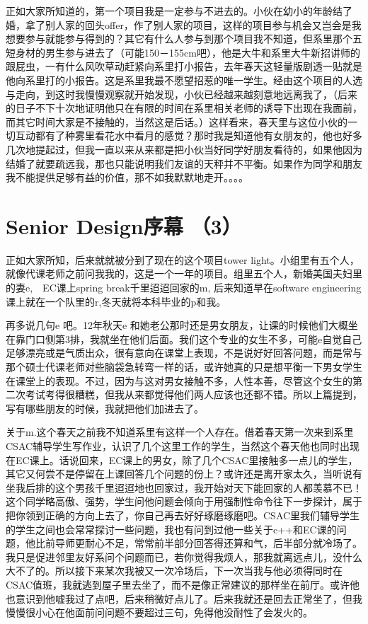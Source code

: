 \documentclass[12pt]{book}
\begin{document}
正如大家所知道的，第一个项目我是一定参与不进去的。小伙在幼小的年龄结了婚，拿了别人家的回头offer，作了别人家的项目，这样的项目参与机会又岂会是我想要参与就能参与得到的？其它有什么人参与到那个项目我不知道，但系里那个五短身材的男生参与进去了（可能150－155cm吧），他是大牛和系里大牛新招讲师的跟屁虫，一有什么风吹草动赶紧向系里打小报告，去年春天这轻量版剧透一贴就是他向系里打的小报告。这是系里我最不愿望招惹的唯一学生。经由这个项目的人选与走向，到这时我慢慢观察就开始发现，小伙已经越来越刻意地远离我了，（后来的日子不下十次地证明他只在有限的时间在系里相关老师的诱导下出现在我面前，而其它时间大家是不接触的，当然这是后话。）这样看来，春天里与这位小伙的一切互动都有了种雾里看花水中看月的感觉？那时我是知道他有女朋友的，他也好多几次地提起过，但我一直以来从来都是把小伙当好同学好朋友看待的，如果他因为结婚了就要疏远我，那也只能说明我们友谊的天秤并不平衡。如果作为同学和朋友我不能提供足够有益的价值，那不如我默默地走开。。。。
\section{Senior Design序幕  （3）}
\label{sec-13-3}
正如大家所知，后来就就被分到了现在的这个项目tower light。小组里有五个人，就像代课老师之前问我我的，这是一个一年的项目。组里五个人，新婚美国夫妇里的妻e,　EC课上spring break千里迢迢回家的m, 后来知道早在software engineering课上就在一个队里的r,冬天就将本科毕业的p和我。

再多说几句e 吧。12年秋天e 和她老公那时还是男女朋友，让课的时候他们大概坐在靠门口侧第3排，我就坐在他们后面。我们这个专业的女生不多，可能e自觉自己足够漂亮或是气质出众，很有意向在课堂上表现，不是说好好回答问题，而是常与那个硕士代课老师对些脑袋急转弯一样的话，或许她真的只是想平衡一下男女学生在课堂上的表现。不过，因为与这对男女接触不多，人性本善，尽管这个女生的第二次考试考得很糟糕，但我从来都觉得他们两人应该也还都不错。所以上篇提到，写有哪些朋友的时候，我就把他们加进去了。

关于m.这个春天之前我不知道系里有这样一个人存在。借着春天第一次来到系里CSAC辅导学生写作业，认识了几个这里工作的学生，当然这个春天他也同时出现在EC课上。话说回来，EC课上的男女，除了几个CSAC里接触多一点儿的学生，其它又何尝不是停留在上课回答几个问题的份上？或许还是离开家太久，当听说有坐我后排的这个男孩千里迢迢地也回家过，我开始对天下能回家的人都羡慕不已！这个同学略高傲、强势，学生问他问题会倾向于用强制性命令往下一步探计，属于把你领到正确的方向上去了，你自己再去好好琢磨琢磨吧。CSAC里我们辅导学生的学生之间也会常常探讨一些问题，我也有问到过他一些关于c++和EC课的问题，他比前导师更耐心不足，常常前半部分回答得还算和气，后半部分就冷场了。我只是促进邻里友好系问个问题而已，若你觉得我烦人，那我就离远点儿，没什么大不了的。所以接下来某次我被又一次冷场后，下一次当我与他必须得同时在CSAC值班，我就逃到屋子里去坐了，而不是像正常建议的那样坐在前厅。或许他也意识到他嘘我过了点吧，后来稍微好点儿了。后来我就还是回去正常坐了，但我慢慢很小心在他面前问问题不要超过三句，免得他没耐性了会发火的。
\end{document}
